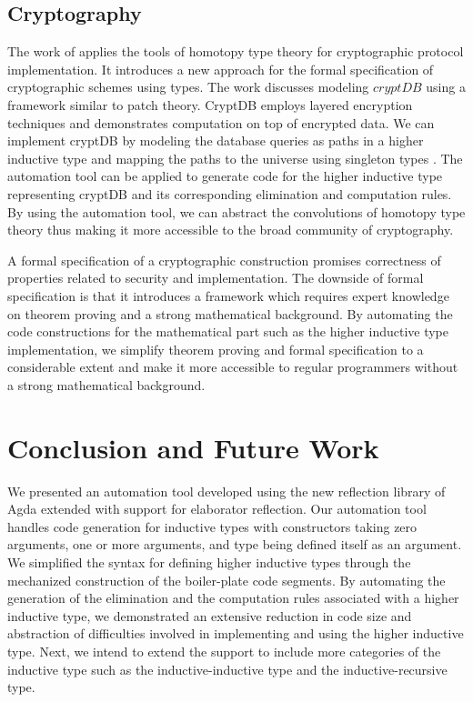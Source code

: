 \documentclass[sigplan,10pt]{acmart}
\begin{document}
\subsection{Cryptography}
\label{crypto}
The work of \cite{Paventhan-2018} applies the tools of homotopy type theory for cryptographic protocol implementation. It introduces a new approach for the formal specification of cryptographic schemes using types. The work discusses modeling $cryptDB$ \citep{Popa-2011} using a framework similar to patch theory. CryptDB employs layered encryption techniques and demonstrates computation on top of encrypted data. We can implement cryptDB by modeling the database queries as paths in a higher inductive type and mapping the paths to the universe using singleton types \cite{Angiuli-2014}. The automation tool can be applied to generate code for the higher inductive type representing cryptDB and its corresponding elimination and computation rules. By using the automation tool, we can abstract the convolutions of homotopy type theory thus making it more accessible to the broad community of cryptography.

A formal specification of a cryptographic construction promises correctness of properties related to security and implementation. The downside of formal specification is that it introduces a framework which requires expert knowledge on theorem proving and a strong mathematical background. By automating the code constructions for the mathematical part such as the higher inductive type implementation, we simplify theorem proving and formal specification to a considerable extent and make it more accessible to regular programmers without a strong mathematical background.

\section{Conclusion and Future Work}
We presented an automation tool developed using the new reflection library of Agda extended with support for elaborator reflection. Our automation tool handles code generation for inductive types with constructors taking zero arguments, one or more arguments, and type being defined itself as an argument. We simplified the syntax for defining higher inductive types through the mechanized construction of the boiler-plate code segments. By automating the generation of the elimination and the computation rules associated with a higher inductive type, we demonstrated an extensive reduction in code size and abstraction of difficulties involved in implementing and using the higher inductive type. Next, we intend to extend the support to include more categories of the inductive type such as the inductive-inductive type and the inductive-recursive type.




\end{document}
